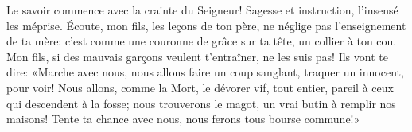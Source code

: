 Le savoir commence avec la crainte du Seigneur!
	Sagesse et instruction, l’insensé les méprise.
Écoute, mon fils, les leçons de ton père,
	ne néglige pas l’enseignement de ta mère:
	c’est comme une couronne de grâce sur ta tête, un collier à ton cou.
Mon fils, si des mauvais garçons veulent t’entraîner, ne les suis pas!
Ils vont te dire: «Marche avec nous,
	nous allons faire un coup sanglant, traquer un innocent, pour voir!
	Nous allons, comme la Mort, le dévorer vif, tout entier,
	pareil à ceux qui descendent à la fosse;
	nous trouverons le magot, un vrai butin à remplir nos maisons!
	Tente ta chance avec nous, nous ferons tous bourse commune!»
